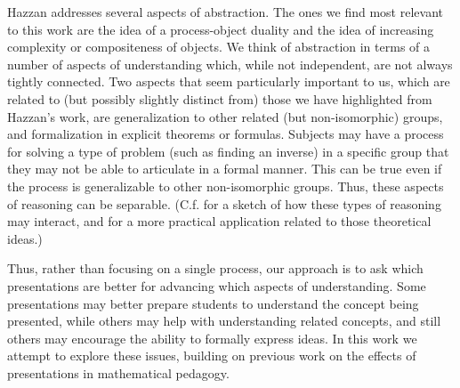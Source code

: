\documentclass[man,10pt]{apa6}
\begin{document}
Hazzan addresses several aspects of abstraction. The ones we find most relevant to this work are the idea of a process-object duality and the idea of increasing complexity or compositeness of objects. We think of abstraction in terms of a number of aspects of understanding which, while not independent, are not always tightly connected. Two aspects that seem particularly important to us, which are related to (but possibly slightly distinct from) those we have highlighted from Hazzan's work, are generalization to other related (but non-isomorphic) groups, and formalization in explicit theorems or formulas. Subjects may have a process for solving a type of problem (such as finding an inverse) in a specific group that they may not be able to articulate in a formal manner. This can be true even if the process is generalizable to other non-isomorphic groups. Thus, these aspects of reasoning can be separable. (C.f. \cite{Dubinsky1991} for a sketch of how these types of reasoning may interact, and \cite{Leron1995} for a more practical application related to those theoretical ideas.) \par
Thus, rather than focusing on a single process, our approach is to ask which presentations are better for advancing which aspects of understanding. Some presentations may better prepare students to understand the concept being presented, while others may help with understanding related concepts, and still others may encourage the ability to formally express ideas. In this work we attempt to explore these issues, building on previous work on the effects of presentations in mathematical pedagogy. 
\end{document}
